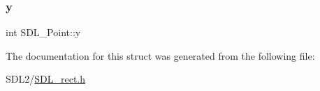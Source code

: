 \mbox{\label{struct_s_d_l___point_aaa68aefa869f6bdf46367a70bd9414b0}} 
\subsubsection{\texorpdfstring{y}{y}}
{\footnotesize\ttfamily int S\+D\+L\+\_\+\+Point\+::y}



The documentation for this struct was generated from the following file\+:\begin{DoxyCompactItemize}
\item 
S\+D\+L2/\hyperlink{_s_d_l__rect_8h}{S\+D\+L\+\_\+rect.\+h}\end{DoxyCompactItemize}
